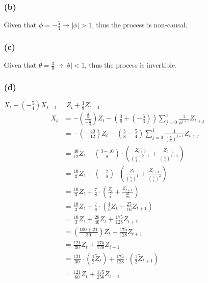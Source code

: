 \documentclass[
]{article}
\begin{document}
\hypertarget{b}{%
\subsubsection{(b)}\label{b}}

Given that \(\phi = -\frac{5}{4} \to |\phi| > 1\), thus the process is
non-causal.\\

\hypertarget{c}{%
\subsubsection{(c)}\label{c}}

Given that \(\theta = \frac{3}{8} \to |\theta| < 1\), thus the process
is invertible.\\

\hypertarget{d}{%
\subsubsection{(d)}\label{d}}

\(X_{t} - (-\frac{5}{4}) X_{t - 1} = Z_{t} + \frac{3}{8} Z_{t - 1}\)\\

\begin{align*}
X_{t} &= - (\frac{\frac{3}{8}}{-\frac{5}{4}}) Z_{t} - (\frac{3}{8} + (- \frac{5}{4})) \sum_{j = 0}^{1} \frac{1}{\phi^{j + 1}} Z_{t + j} \\
&= - (- \frac{40}{12}) Z_{t} - (\frac{3}{8} - \frac{5}{4}) \sum_{j = 0}^{1} \frac{1}{(\frac{5}{4})^{j + 1}} Z_{t + j} \\
&= \frac{40}{12} Z_{t} - (\frac{3 - 10}{8}) \cdot (\frac{Z_{t + 0}}{(\frac{5}{4})^{0 + 1}} + \frac{Z_{t + 1}}{(\frac{5}{4})^{1 + 1}}) \\
&= \frac{10}{3} Z_{t} - (-\frac{7}{8}) \cdot (\frac{Z_{t}}{(\frac{5}{4})^{1}} + \frac{Z_{t + 1}}{(\frac{5}{4})^{2}}) \\
&= \frac{10}{3} Z_{t} + \frac{7}{8}  \cdot (\frac{Z_{t}}{\frac{5}{4}} + \frac{Z_{t + 1}}{\frac{25}{26}}) \\
&= \frac{10}{3} Z_{t} + \frac{7}{8}  \cdot (\frac{4}{5} Z_{t} + \frac{25}{16} Z_{t + 1}) \\
&= \frac{10}{3} Z_{t} + \frac{28}{40} Z_{t} + \frac{175}{128} Z_{t + 1} \\
&= (\frac{100 + 21}{30}) Z_{t} + \frac{175}{128} Z_{t + 1} \\
&= \frac{121}{30} Z_{t} + \frac{175}{128} Z_{t + 1} \\
&= \frac{121}{30} \cdot (\frac{1}{2} \tilde{Z}_{t}) + \frac{175}{128} \cdot (\frac{1}{2} \tilde{Z}_{t + 1}) \\
&= \frac{121}{60} \tilde{Z}_{t} + \frac{175}{256} \tilde{Z}_{t + 1} \\
\end{align*}
\end{document}
